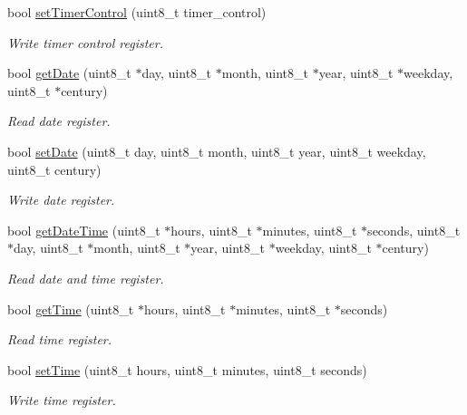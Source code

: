 \begin{DoxyCompactItemize}
bool \hyperlink{namespacePcf8563_a112b6debc61100cd3ab737af9d31e119}{set\+Timer\+Control} (uint8\+\_\+t timer\+\_\+control)
\begin{DoxyCompactList}\small\item\em Write timer control register. \end{DoxyCompactList}\item 
bool \hyperlink{namespacePcf8563_aa852ae63d80f0a9137b3910a3b193d89}{get\+Date} (uint8\+\_\+t $\ast$day, uint8\+\_\+t $\ast$month, uint8\+\_\+t $\ast$year, uint8\+\_\+t $\ast$weekday, uint8\+\_\+t $\ast$century)
\begin{DoxyCompactList}\small\item\em Read date register. \end{DoxyCompactList}\item 
bool \hyperlink{namespacePcf8563_aa8a735e59aae37d9184b17cb84de4f85}{set\+Date} (uint8\+\_\+t day, uint8\+\_\+t month, uint8\+\_\+t year, uint8\+\_\+t weekday, uint8\+\_\+t century)
\begin{DoxyCompactList}\small\item\em Write date register. \end{DoxyCompactList}\item 
bool \hyperlink{namespacePcf8563_aaa1099008bec7e232d47ca6056777c23}{get\+Date\+Time} (uint8\+\_\+t $\ast$hours, uint8\+\_\+t $\ast$minutes, uint8\+\_\+t $\ast$seconds, uint8\+\_\+t $\ast$day, uint8\+\_\+t $\ast$month, uint8\+\_\+t $\ast$year, uint8\+\_\+t $\ast$weekday, uint8\+\_\+t $\ast$century)
\begin{DoxyCompactList}\small\item\em Read date and time register. \end{DoxyCompactList}\item 
bool \hyperlink{namespacePcf8563_aeb90b131ae770b2dcb9b167ea3856ed4}{get\+Time} (uint8\+\_\+t $\ast$hours, uint8\+\_\+t $\ast$minutes, uint8\+\_\+t $\ast$seconds)
\begin{DoxyCompactList}\small\item\em Read time register. \end{DoxyCompactList}\item 
bool \hyperlink{namespacePcf8563_a797213f5e675582765df0b42ab921999}{set\+Time} (uint8\+\_\+t hours, uint8\+\_\+t minutes, uint8\+\_\+t seconds)
\begin{DoxyCompactList}\small\item\em Write time register. \end{DoxyCompactList}\item 

\end{DoxyCompactItemize}
